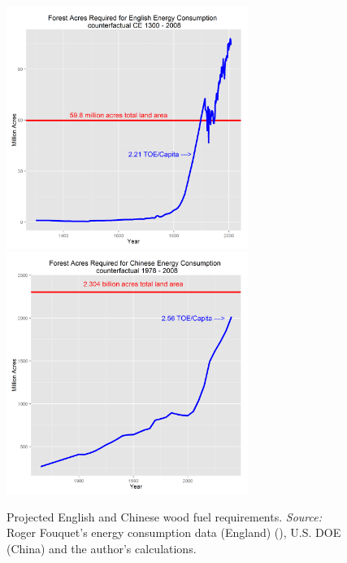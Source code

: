 \documentclass[12pt]{article}
\numberwithin{equation}{section}
\begin{document}
		\begin{figure}[ftb]
		\centerline{
		\mbox{\includegraphics[width=0.70\textwidth]{wood.png}}
		\mbox{\includegraphics[width=0.70\textwidth]{chinawood.png}}
		}
		\caption{Projected English and Chinese wood fuel requirements. \textit{Source:} Roger Fouquet's energy consumption data (England) (\citeyear{fouquet_heat_2008}), U.S. DOE (China) and the author's calculations.} 
		\label{fig:eng_wood}
		\end{figure}
		
\end{document}
